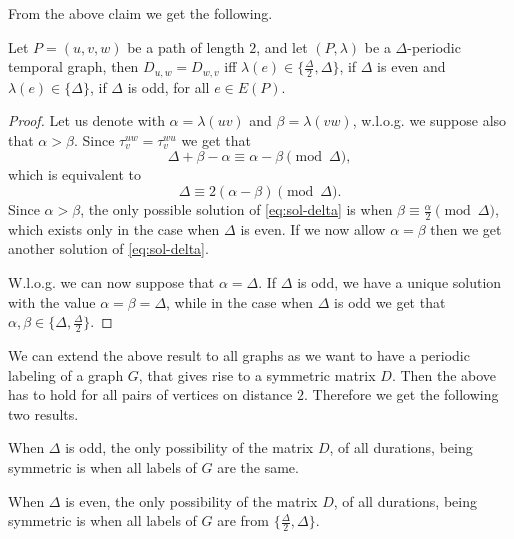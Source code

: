 \documentclass[a4paper,UKenglish,cleveref, autoref, thm-restate]{lipics-v2021}
\begin{document}
From the above claim we get the following.

\begin{claim}
	Let $P = (u, v, w)$ be a path of length $2$, and let $(P,\lambda)$ be a $\Delta$-periodic temporal graph, 
	then $D_{u,w} = D_{w,v}$
	iff
	$\lambda(e) \in \{\frac{\Delta}{2}, \Delta\}$, if $\Delta$ is even and
	$\lambda(e) \in \{\Delta\}$, if $\Delta$ is odd,
	for all $e \in E(P)$.
\end{claim}

\begin{proof}
		Let us denote with $\alpha = \lambda(uv)$ and  $\beta = \lambda(vw)$,
		w.l.o.g. we suppose also that $\alpha > \beta$.
		Since
		$\tau_v^{uw} = \tau_v^{wu}$
		we get that
		\begin{equation*}
			\Delta + \beta - \alpha \equiv \alpha - \beta \pmod\Delta,
		\end{equation*}
		which is equivalent to
		\begin{equation}\label{eq:sol-delta}
			\Delta  \equiv 2 (\alpha - \beta) \pmod\Delta.
		\end{equation}
		Since $\alpha > \beta$, the only possible solution of \cref{eq:sol-delta} is when $\beta \equiv \frac{\alpha}{2} \pmod \Delta$, which exists only in the case when $\Delta$ is even.
		If we now allow $\alpha = \beta$ then we get another solution of \cref{eq:sol-delta}.
		
		W.l.o.g. we can now suppose that $\alpha = \Delta$.
		If $\Delta$ is odd, we have a unique solution with the value $\alpha=\beta = \Delta$,
		while in the case when $\Delta$ is odd we get that $\alpha, \beta \in \{\Delta, \frac{\Delta}{2}\}$. 
\end{proof}

We can extend the above result to all graphs as we want to have a periodic labeling of a graph $G$, that gives rise to a symmetric matrix $D$. 
Then the above has to hold for all pairs of vertices on distance $2$.
Therefore we get the following two results.

\begin{claim}\label{claim:symmetric-odd}
	When $\Delta$ is odd, the only possibility of the matrix $D$, of all durations, being symmetric is when all labels of $G$ are the same.
\end{claim}

\begin{claim}\label{claim:symmetric-even}
	When $\Delta$ is even, the only possibility of the matrix $D$, of all durations, being symmetric is when all labels of $G$ are from $\{\frac{\Delta}{2}, \Delta\}$.
\end{claim}
\end{document}
